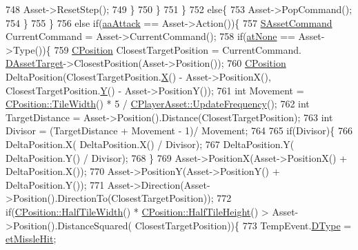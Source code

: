 \begin{DoxyCode}
748                        Asset->ResetStep();
749                     \}
750                 \}
751             \}
752             \textcolor{keywordflow}{else}\{
753                 Asset->PopCommand();
754             \}
755         \}
756         \textcolor{keywordflow}{else} \textcolor{keywordflow}{if}(\hyperlink{GameDataTypes_8h_ab47668e651a3032cfb9c40ea2d60d670a948eefd20b9e43d3b4cfcf613774716d}{aaAttack} == Asset->Action())\{
757             \hyperlink{structSAssetCommand}{SAssetCommand} CurrentCommand = Asset->CurrentCommand();
758             \textcolor{keywordflow}{if}(\hyperlink{GameDataTypes_8h_a5600d4fc433b83300308921974477feca82fb51718e2c00981a2d37bc6fe92593}{atNone} == Asset->Type())\{
759                 \hyperlink{classCPosition}{CPosition} ClosestTargetPosition = CurrentCommand.
      \hyperlink{structSAssetCommand_a3d9b43f6e59c386c48c41a65448a0c39}{DAssetTarget}->ClosestPosition(Asset->Position());
760                 \hyperlink{classCPosition}{CPosition} DeltaPosition(ClosestTargetPosition.\hyperlink{classCPosition_a9a6b94d3b91df1492d166d9964c865fc}{X}() - Asset->PositionX(), 
      ClosestTargetPosition.\hyperlink{classCPosition_a1aa8a30e2f08dda1f797736ba8c13a87}{Y}() - Asset->PositionY());
761                 \textcolor{keywordtype}{int} Movement = \hyperlink{classCPosition_a27a7a8b9a5541da0aa8d97d785650fb8}{CPosition::TileWidth}() * 5 / 
      \hyperlink{classCPlayerAsset_a0aff85b9552967a42f4f3f42cb59c19f}{CPlayerAsset::UpdateFrequency}();
762                 \textcolor{keywordtype}{int} TargetDistance = Asset->Position().Distance(ClosestTargetPosition);
763                 \textcolor{keywordtype}{int} Divisor = (TargetDistance + Movement - 1)/ Movement;
764                 
765                 \textcolor{keywordflow}{if}(Divisor)\{
766                     DeltaPosition.X( DeltaPosition.X() / Divisor);    
767                     DeltaPosition.Y( DeltaPosition.Y() / Divisor);
768                 \}
769                 Asset->PositionX(Asset->PositionX() + DeltaPosition.X());
770                 Asset->PositionY(Asset->PositionY() + DeltaPosition.Y());
771                 Asset->Direction(Asset->Position().DirectionTo(ClosestTargetPosition));
772                 \textcolor{keywordflow}{if}(\hyperlink{classCPosition_a4b799a0fb78ddd8bbd8548980e2458af}{CPosition::HalfTileWidth}() * 
      \hyperlink{classCPosition_a5e371060b1aa0d3d3c5df1e353e0e5fd}{CPosition::HalfTileHeight}() > Asset->Position().DistanceSquared(
      ClosestTargetPosition))\{
773                     TempEvent.\hyperlink{structSGameEvent_afa10562e243f4ac2b473b655cc58fee7}{DType} = \hyperlink{GameModel_8h_abfcf510bafec7c6429906a6ecaac656da0a45453f61b6c27d3e65b3a2f1441cf1}{etMissleHit};

\end{DoxyCode}
